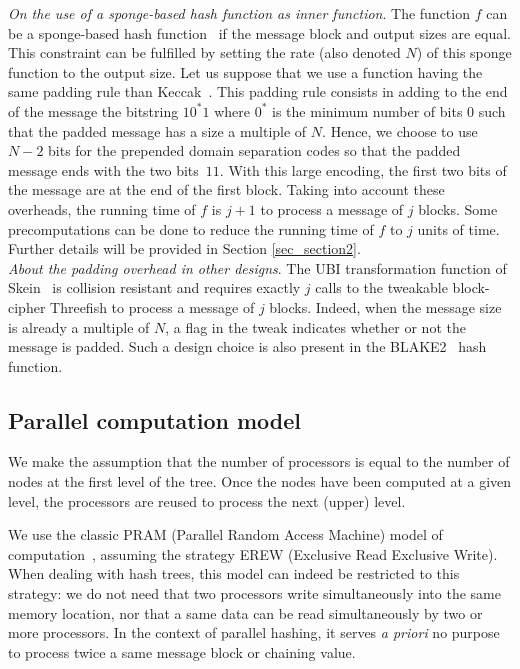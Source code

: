 \documentclass{llncs}
\renewcommand{\paragraph}[1]{\noindent\textit{#1}.}
\begin{document}
\paragraph{On the use of a sponge-based hash function as inner function}
The function $f$ can be a sponge-based hash function~\cite{BerDaePeeVan08} if the message block and output sizes are equal.
This constraint can be fulfilled by setting the rate (also denoted $N$) of this sponge function to the output size. Let us suppose that we use
a function having the same padding rule than Keccak~\cite{BerDaePeeVan13}. This padding rule consists in adding to the end of the message 
the bitstring $10^*1$ where $0^*$ is
the minimum number of bits $0$ such that the padded message has a size a multiple of $N$. 
Hence, we choose to use $N-2$ bits for the prepended domain separation codes so that the padded message ends with the two bits~$11$.
With this large encoding, the first two bits of the message are at the end of the first block. Taking into account these overheads, the running time of
$f$ is $j+1$ to process a message of $j$ blocks.
Some precomputations can be done to reduce the running time of $f$ to $j$ units of time. 
Further details will be provided in Section \ref{sec_section2}.~\\

\paragraph{About the padding overhead in other designs} The UBI transformation function of Skein~\cite{FLSWBKCW09} is collision resistant and 
requires exactly $j$ calls to the tweakable
block-cipher Threefish to process a message of $j$ blocks. Indeed, when the message size is already a multiple of $N$, a flag in the tweak indicates whether
or not the message is padded. Such a design choice is also present in the BLAKE2~\cite{ANWW13} hash function.

\subsection{Parallel computation model}

We make the assumption that the number of processors is equal to the number of nodes at the first level of the tree. Once the nodes have been computed 
at a given level, the processors are reused to process the next (upper) level.

We use the classic PRAM (Parallel Random Access Machine) model of computation~\cite{GiRy88},
assuming the strategy EREW (Exclusive Read Exclusive Write). When dealing with hash trees, this model can indeed 
be restricted to this strategy: we do not need that two processors write simultaneously into the same memory location, nor that a same data
can be read simultaneously by two or more processors. In the context of parallel hashing, 
it serves \textit{a priori} no purpose to process twice a same message block or chaining value.
\end{document}
